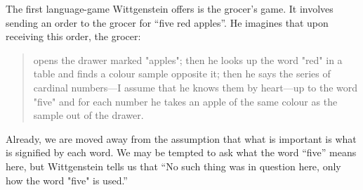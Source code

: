 \documentclass[man,12pt,natbib]{apa6}
\begin{document}
The first language-game Wittgenstein offers is the grocer's game. It involves
sending an order to the grocer for ``five red apples''. He imagines that upon
receiving this order, the grocer:
\begin{quote}
	opens the drawer marked "apples"; then he looks up the word "red" in a
	table and finds a colour sample opposite it; then he says the series of
	cardinal numbers---I assume that he knows them by heart---up to the word
	"five" and for each number he takes an apple of the same colour as the
	sample out of the drawer. \cite[\S 1]{Wittgenstein53}
\end{quote}
Already, we are moved away from the assumption that what is important is what
is signified by each word. 
%
We may be tempted to ask what the word ``five'' means here, but Wittgenstein
tells us that ``No such thing was in question here, only how the word "five"
is used.''
\end{document}
